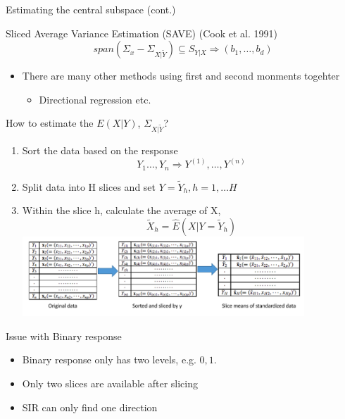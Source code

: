 \documentclass[ignorenonframetext,]{beamer}
\providecommand{\tightlist}{%
  \setlength{\itemsep}{0pt}\setlength{\parskip}{0pt}}
\begin{document}
\begin{frame}{Estimating the central subspace (cont.)}

\begin{block}{Sliced Average Variance Estimation (SAVE) (Cook et al. 1991)} 
\[
span(\Sigma_x - \Sigma_{X|\tilde{Y}}) \subseteq S_{Y|X} \Rightarrow  ({b}_1, \dots, {b}_d)
\]
\end{block}

\begin{itemize}
\tightlist
\item
  There are many other methods using first and second monments togehter

  \begin{itemize}
  \tightlist
  \item
    Directional regression etc.
  \end{itemize}
\end{itemize}

\end{frame}

\begin{frame}{How to estimate the \(E(X|Y)\), \(\Sigma_{X|\tilde{Y}}\)?}

\begin{enumerate}
\def\labelenumi{\arabic{enumi}.}
\tightlist
\item
  Sort the data based on the response \[
    Y_1 \dots, Y_n \Rightarrow Y^{(1)},\dots,Y^{(n)} 
  \]
\item
  Split data into H slices and set \(Y = \tilde{Y}_h, h = 1,\dots H\)
\item
  Within the slice h, calculate the average of X,
  \[\tilde{X}_h = \hat{E}(X|Y = \tilde{Y}_h)\]
  \includegraphics[width=4.16667in]{./pic/slice method.png}
\end{enumerate}

\end{frame}

\begin{frame}{Issue with Binary response}

\begin{itemize}
\item
  Binary response only has two levels, e.g. \(0,1\).
\item
  Only two slices are available after slicing
\item
  SIR can only find one direction
\end{itemize}

\end{frame}
\end{document}

